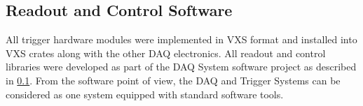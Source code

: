 \subsection{Readout and Control Software}

All trigger hardware modules were implemented in VXS format and installed into VXS crates along with the other DAQ electronics. All readout and control libraries were developed as part of the DAQ System software project as described in \ref{}. From the software point of view, the DAQ and Trigger Systems can be considered as one system equipped with standard software tools.